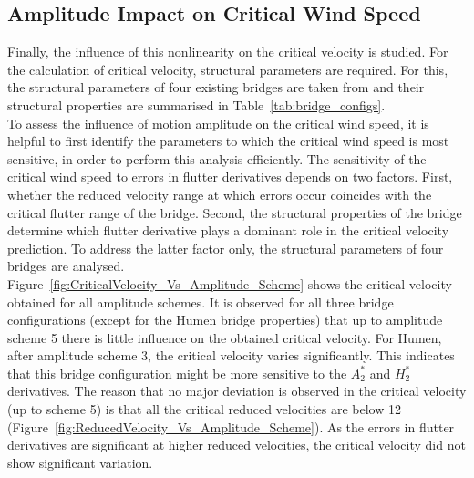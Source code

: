 \documentclass[../main]{subfiles}
\begin{document}
\subsection{Amplitude Impact on Critical Wind Speed}

Finally, the influence of this nonlinearity on the critical velocity is studied. For the calculation of critical velocity, 
structural parameters are required. For this, the structural parameters of four existing bridges are taken from 
\cite{diana2020, xin2007, zhan2012_Tacoma_Narrows} and their structural properties are 
summarised in Table~\ref{tab:bridge_configs}. \\

To assess the influence of motion amplitude on the critical wind speed, it is helpful to first identify the parameters 
to which the critical wind speed is most sensitive, in order to perform this analysis efficiently. 
The sensitivity of the critical wind speed to errors in flutter derivatives depends on two factors. First, whether the reduced velocity
range at which errors occur coincides with the critical flutter range of the bridge. Second,
the structural properties of the bridge determine which flutter derivative plays a dominant
role in the critical velocity prediction. To address the latter factor only, the structural 
parameters of four bridges are analysed. \\

Figure~\ref{fig:CriticalVelocity_Vs_Amplitude_Scheme} shows the critical velocity obtained for all amplitude schemes. 
It is observed for all three bridge configurations (except for the Humen bridge properties) that up to amplitude scheme 5 there is little influence on 
the obtained critical velocity. For Humen, after amplitude scheme 3, the critical velocity varies significantly. This indicates that this
bridge configuration might be more sensitive to the $A_2^*$ and $H_2^*$ derivatives. The reason that no major deviation is observed 
in the critical velocity (up to scheme 5) is that all the critical reduced velocities are below 12 (Figure~\ref{fig:ReducedVelocity_Vs_Amplitude_Scheme}). 
As the errors in flutter derivatives are significant at higher reduced velocities, 
the critical velocity did not show significant variation. \\
\end{document}
